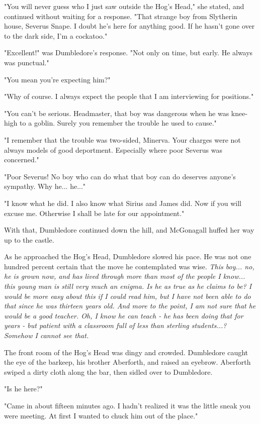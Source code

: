 "You will never guess who I just saw outside the Hog's Head," she stated, and continued without waiting for a response. "That strange boy from Slytherin house, Severus Snape. I doubt he's here for anything good. If he hasn't gone over to the dark side, I'm a cockatoo."

"Excellent!" was Dumbledore's response. "Not only on time, but early. He always was punctual."

"You mean you're expecting him?"

"Why of course. I always expect the people that I am interviewing for positions."

"You can't be serious. Headmaster, that boy was dangerous when he was knee-high to a goblin. Surely you remember the trouble he used to cause."

"I remember that the trouble was two-sided, Minerva. Your charges were not always models of good deportment. Especially where poor Severus was concerned."

"Poor Severus! No boy who can do what that boy can do deserves anyone's sympathy. Why he... he..."

"I know what he did. I also know what Sirius and James did. Now if you will excuse me. Otherwise I shall be late for our appointment."

With that, Dumbledore continued down the hill, and McGonagall huffed her way up to the castle.

As he approached the Hog's Head, Dumbledore slowed his pace. He was not one hundred percent certain that the move he contemplated was wise. \emph{This boy... no, he is grown now, and has lived through more than most of the people I know... this young man is still very much an enigma. Is he as true as he claims to be? I would be more easy about this if I could read him, but I have not been able to do that since he was thirteen years old. And more to the point, I am not sure that he would be a good teacher. Oh, I know he can teach - he has been doing that for years - but patient with a classroom full of less than sterling students...? Somehow I cannot see that.}

The front room of the Hog's Head was dingy and crowded. Dumbledore caught the eye of the barkeep, his brother Aberforth, and raised an eyebrow. Aberforth swiped a dirty cloth along the bar, then sidled over to Dumbledore.

"Is he here?"

"Came in about fifteen minutes ago. I hadn't realized it was the little sneak you were meeting. At first I wanted to chuck him out of the place."

